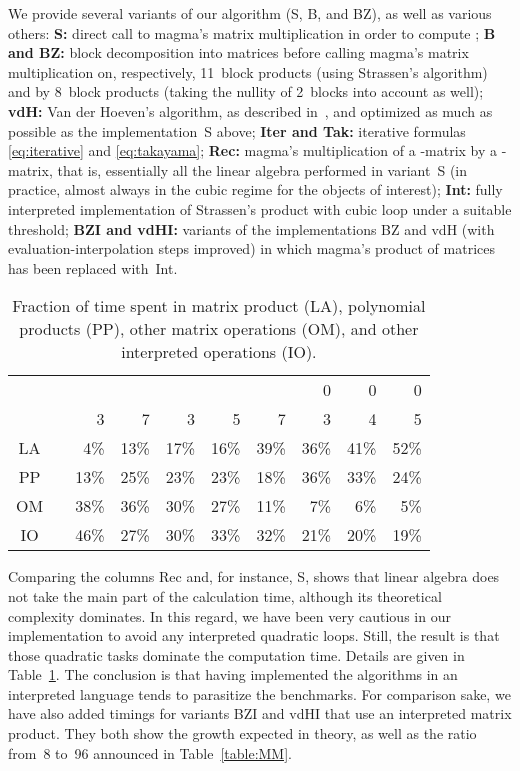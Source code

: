 \documentclass{sig-alt-full}
\begin{document}
We provide several variants of our algorithm (S, B, and BZ), as well as various others:
{\bf S:}
direct call to \textsf{magma}'s matrix multiplication in order to compute
;
{\bf B and BZ:}
block decomposition into  matrices before calling \textsf{magma}'s  matrix multiplication on, respectively, 11~block products (using Strassen's algorithm) and by 8~block products (taking the nullity of 2~blocks into account as well);
{\bf vdH:}
Van der Hoeven's algorithm, as described in~\cite{vdHoeven02}, and optimized as much as possible as the implementation~S above;
{\bf Iter and Tak:}
iterative formulas \eqref{eq:iterative} and \eqref{eq:takayama};
{\bf Rec:}
\textsf{magma}'s multiplication of a -matrix by a -matrix, that is, essentially all the linear algebra performed in variant~S (in practice, almost always in the cubic regime for the objects of interest);
{\bf Int:}
fully interpreted implementation of Strassen's product with cubic loop under a suitable threshold;
{\bf BZI and vdHI:}
variants of the implementations BZ and vdH (with evaluation-interpolation steps improved) in which \textsf{magma}'s product of matrices has been replaced with~Int.

\begin{table}[ht]
\begin{small}
\begin{center}
\setlength{\tabcolsep}{2.5pt}
\begin{tabular}{cc|rr|rrr|rrr}
& & & & & & &    0 &    0 &    0 \\
& &    3 &    7 &    3 &    5 &    7 &    3 &    4 &    5 \\
\hline
LA &  &  4\% & 13\% & 17\% & 16\% & 39\% & 36\% & 41\% & 52\% \\
PP &  & 13\% & 25\% & 23\% & 23\% & 18\% & 36\% & 33\% & 24\% \\
OM &  & 38\% & 36\% & 30\% & 27\% & 11\% &  7\% &  6\% &  5\% \\
IO &  & 46\% & 27\% & 30\% & 33\% & 32\% & 21\% & 20\% & 19\%
\end{tabular}
\caption{\label{table:percentages}Fraction of time spent in matrix product (LA), polynomial products (PP), other matrix operations (OM), and other interpreted operations (IO).}
\end{center}
\end{small}
\end{table}
\vskip-7pt

Comparing the columns Rec and, for instance, S, shows that linear algebra does not take the main part of the calculation time, although its theoretical complexity dominates.
In this regard, we have been very cautious in our implementation to avoid any interpreted quadratic loops.
Still, the result is that those quadratic tasks dominate the computation time.
Details are given in Table~\ref{table:percentages}.
The conclusion is that having implemented the algorithms in an interpreted language tends to parasitize the benchmarks.
For comparison sake, we have also added timings for variants BZI and vdHI that use an interpreted matrix product.
They both show the growth expected in theory, as well as the ratio from~8 to~96 announced in Table~\ref{table:MM}.
\end{document}
